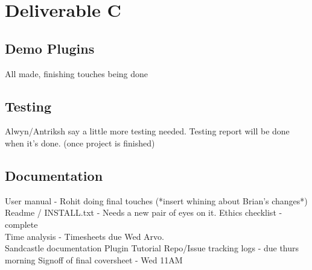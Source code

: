 
\date{17 Oct, 2011}
\absent{-}
\apologies{-}



\section{Deliverable C}
\subsection{Demo Plugins}
All made, finishing touches being done

\subsection{Testing}
Alwyn/Antriksh say a little more testing needed. Testing report will be done when it's done. (once project is finished)

\subsection{Documentation}
User manual - Rohit doing final touches (*insert whining about Brian's changes*) \\
Readme / INSTALL.txt - Needs a new pair of eyes on it. 
Ethics checklist - complete \\ %
Time analysis - Timesheets due Wed Arvo. \\
Sandcastle documentation 
Plugin Tutorial 
Repo/Issue tracking logs - due thurs morning 
Signoff of final coversheet - Wed 11AM 



